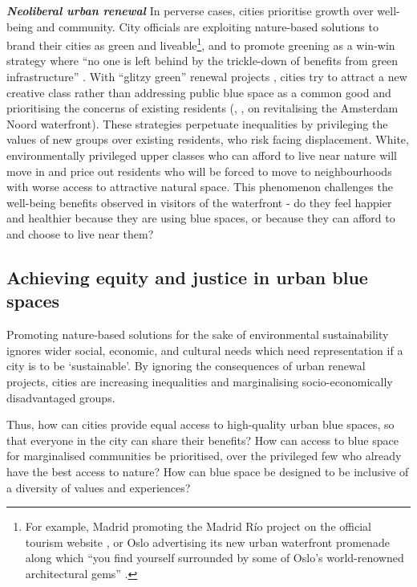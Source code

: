 \documentclass{article}
\newcommand{\bisection}[1]{\textbf{\textit{#1}}}
\begin{document}

\bisection{Neoliberal urban renewal}
In perverse cases, cities prioritise growth over well-being and community. 
City officials are exploiting nature-based solutions to brand their cities as green and liveable\footnote{For example, Madrid promoting the Madrid Río project on the official tourism website \parencite{madridrio}, or Oslo advertising its new urban waterfront promenade along which ``you find yourself surrounded by some of Oslo's world-renowned architectural gems'' \parencite{visitoslo}.}, and to promote greening as a win-win strategy where ``no one is left behind by the trickle-down of benefits from green infrastructure'' \parencite{anguelovski2021green}.
With ``glitzy green'' renewal projects \parencite{anguelovski2021green}, cities try to attract a new creative class rather than addressing public blue space as a common good and prioritising the concerns of existing residents (\cite{wessells2014urban}, \cite{anguelovski2020expanding}, \cite{del2021dismantling} on revitalising the Amsterdam Noord waterfront).
These strategies perpetuate inequalities by privileging the values of new groups over existing residents, who risk facing displacement. White, environmentally privileged upper classes who can afford to live near nature will move in and price out residents who will be forced to move to neighbourhoods with worse access to attractive natural space. This phenomenon challenges the well-being benefits observed in visitors of the waterfront - do they feel happier and healthier because they are using blue spaces, or because they can afford to and choose to live near them?

\subsection{Achieving equity and justice in urban blue spaces}

Promoting nature-based solutions for the sake of environmental sustainability ignores wider social, economic, and cultural needs which need representation if a city is to be `sustainable'. By ignoring the consequences of urban renewal projects, cities are increasing inequalities and marginalising socio-economically disadvantaged groups. 

Thus, how can cities provide equal access to high-quality urban blue spaces, so that everyone in the city can share their benefits?
How can access to blue space for marginalised communities be prioritised, over the privileged few who already have the best access to nature?
How can blue space be designed to be inclusive of a diversity of values and experiences? 
\end{document}
